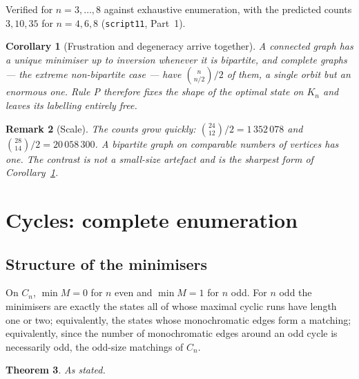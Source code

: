 \documentclass[11pt,a4paper]{article}
\newtheorem{theorem}{Theorem}[section]
\newtheorem{corollary}[theorem]{Corollary}
\newtheorem{remark}[theorem]{Remark}
\newcommand{\Kn}{K_n}
\begin{document}
Verified for $n=3,\dots,8$ against exhaustive enumeration, with the predicted counts $3,10,35$ for $n=4,6,8$ (\texttt{script11}, Part~1).

\begin{corollary}[Frustration and degeneracy arrive together]
\label{cor:together}
A connected graph has a unique minimiser up to inversion whenever it is bipartite, and complete graphs --- the extreme non-bipartite case --- have $\binom{n}{n/2}/2$ of them, a single orbit but an enormous one. Rule P therefore fixes the \emph{shape} of the optimal state on $\Kn$ and leaves its labelling entirely free.
\end{corollary}

\begin{remark}[Scale]
\label{rem:scale}
The counts grow quickly: $\binom{24}{12}/2=1\,352\,078$ and $\binom{28}{14}/2=20\,058\,300$. A bipartite graph on comparable numbers of vertices has one. The contrast is not a small-size artefact and is the sharpest form of Corollary~\ref{cor:together}.
\end{remark}

\section{Cycles: complete enumeration}
\label{sec:cycles}

\subsection{Structure of the minimisers}

\begin{theorembox}
On $C_n$, $\min M=0$ for $n$ even and $\min M=1$ for $n$ odd. For $n$ odd the minimisers are exactly the states all of whose maximal cyclic runs have length one or two; equivalently, the states whose monochromatic edges form a matching; equivalently, since the number of monochromatic edges around an odd cycle is necessarily odd, the odd-size matchings of $C_n$.
\end{theorembox}

\begin{theorem}
\label{thm:runs}
As stated.
\end{theorem}
\end{document}
